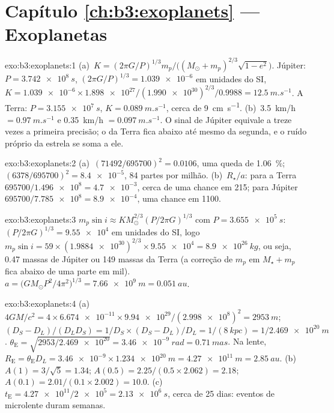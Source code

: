 \section*{Capítulo \ref{ch:b3:exoplanets} --- Exoplanetas}

\begin{solution}{exo:b3:exoplanets:1}
(a)~$K = (2\pi G/P)^{1/3}m_p/\bigl((M_\odot + m_p)^{2/3}\sqrt{1 - e^2}\bigr)$.
Júpiter: $P = \qty{3.742e8}{s}$, $(2\pi G/P)^{1/3} = \num{1.039e-6}$ em
unidades do SI, $K = \num{1.039e-6}\times\num{1.898e27}/(\num{1.990e30})^{2/3}/0.9988
= \qty{12.5}{m.s^{-1}}$. A Terra: $P = \qty{3.155e7}{s}$, $K =
\qty{0.089}{m.s^{-1}}$, cerca de \qty{9}{cm.s^{-1}}. (b)~\qty{3.5}{km/h} $=
\qty{0.97}{m.s^{-1}}$ e \qty{0.35}{km/h} $= \qty{0.097}{m.s^{-1}}$.
O sinal de Júpiter equivale a treze vezes a primeira precisão; o da Terra fica
abaixo até mesmo da segunda, e o ruído próprio da estrela se soma a ele.
\end{solution}

\begin{solution}{exo:b3:exoplanets:2}
(a)~$(71492/695700)^2 = \num{0.0106}$, uma queda de \qty{1.06}{\percent};
$(6378/695700)^2 = \num{8.4e-5}$, 84 partes por milhão. (b)~$R_\star/a$:
para a Terra $695700/\num{1.496e8} = \num{4.7e-3}$, cerca de uma chance em 215;
para Júpiter $695700/\num{7.785e8} = \num{8.9e-4}$, uma chance em 1100.
\end{solution}

\begin{solution}{exo:b3:exoplanets:3}
$m_p\sin i \approx K M_\odot^{2/3}(P/2\pi G)^{1/3}$ com $P =
\qty{3.655e5}{s}$: $(P/2\pi G)^{1/3} = \num{9.55e4}$ em unidades do SI, logo $m_p
\sin i = 59\times(\num{1.9884e30})^{2/3}\times\num{9.55e4} =
\qty{8.9e26}{kg}$, ou seja, 0.47 massas de Júpiter ou 149 massas da Terra (a
correção de $m_p$ em $M_\star + m_p$ fica abaixo de uma parte em mil).
$a = \bigl(GM_\odot P^2/4\pi^2\bigr)^{1/3} = \qty{7.66e9}{m} =
\qty{0.051}{au}$.
\end{solution}

\begin{solution}{exo:b3:exoplanets:4}
(a)~$4GM/c^2 = 4\times\num{6.674e-11}\times\num{9.94e29}/(\num{2.998e8})^2 =
\qty{2953}{m}$; $(D_S - D_L)/(D_LD_S) = 1/D_S\times(D_S - D_L)/D_L =
1/(\qty{8}{kpc}) = 1/\qty{2.469e20}{m}$. $\theta_\mathrm E =
\sqrt{2953/\num{2.469e20}} = \qty{3.46e-9}{rad} = \qty{0.71}{mas}$. Na
lente, $R_\mathrm E = \theta_\mathrm E D_L = \num{3.46e-9}\times
\qty{1.234e20}{m} = \qty{4.27e11}{m} = \qty{2.85}{au}$. (b)~$A(1) =
3/\sqrt5 = 1.34$; $A(0.5) = 2.25/(0.5\times2.062) = 2.18$; $A(0.1) =
2.01/(0.1\times2.002) = 10.0$. (c)~$t_\mathrm E = \num{4.27e11}/\num{2e5}
= \qty{2.13e6}{s}$, cerca de 25 dias: eventos de microlente duram semanas.
\end{solution}

